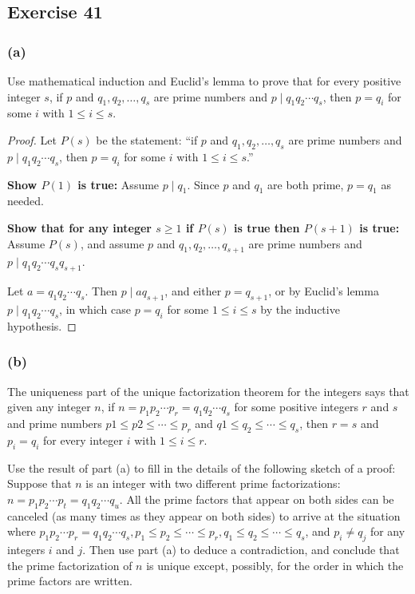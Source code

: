 \documentclass[14pt]{extarticle}
\begin{document}
\subsection{Exercise 41}
\subsubsection{(a)}
Use mathematical induction and Euclid’s lemma to prove that for every positive integer $s$, if $p$ and \(q_1, q_2, 
\ldots, q_s\) are prime numbers and \(p \mid q_1q_2 \cdots q_s\), then \(p=q_i\) for some $i$ with \(1\leq i \leq s\).

\begin{proof}
Let $P(s)$ be the statement: ``if $p$ and \(q_1, q_2, \ldots, q_s\) are prime numbers and \(p \mid q_1q_2 \cdots 
q_s\), then \(p=q_i\) for some $i$ with \(1\leq i \leq s\).''

{\bf Show \(P(1)\) is true:} Assume \(p \mid q_1\). Since $p$ and $q_1$ are both prime, \(p = q_1\) as needed.

{\bf Show that for any integer \(s \geq 1\) if \(P(s)\) is true then \(P(s+1)\) is true:} Assume \(P(s)\), and assume
$p$ and \(q_1, q_2, \ldots, q_{s+1}\) are prime numbers and \(p \mid q_1q_2 \cdots q_s q_{s+1}\). 

Let \(a = q_1q_2 \cdots q_s\). Then \(p \mid a q_{s+1}\), and either \(p = q_{s+1}\), or by Euclid’s lemma 
\(p \mid q_1q_2 \cdots q_s\), in which case \(p = q_i\) for some \(1 \leq i \leq s\) by the inductive hypothesis.
\end{proof}

\subsubsection{(b)}
The uniqueness part of the unique factorization theorem for the integers says that given any integer $n$, if \(n = p_1 
p_2 \cdots p_r = q_1q_2 \cdots q_s\) for some positive integers $r$ and $s$ and prime numbers \(p1 \leq p2 \leq 
\cdots \leq p_r\) and \(q1 \leq q_2 \leq \cdots \leq q_s\), then \(r = s\) and \(p_i = q_i\) for every integer $i$ with 
\(1 \leq i \leq r\).

Use the result of part (a) to fill in the details of the following sketch of a proof: Suppose that $n$ is an integer 
with two different prime factorizations: \(n = p_1 p_2 \cdots p_t = q_1 q_2 \cdots q_u\). All the prime factors 
that appear on both sides can be canceled (as many times as they appear on both sides) to arrive at the situation where 
\(p_1 p_2 \cdots p_r = q_1 q_2 \cdots q_s, p_1 \leq p_2 \leq \cdots \leq p_r, q_1 \leq q_2 \leq \cdots \leq q_s\), 
and \(p_i \neq q_j\) for any integers $i$ and $j$. Then use part (a) to deduce a contradiction, and conclude that the 
prime factorization of $n$ is unique except, possibly, for the order in which the prime factors are written.
\end{document}
